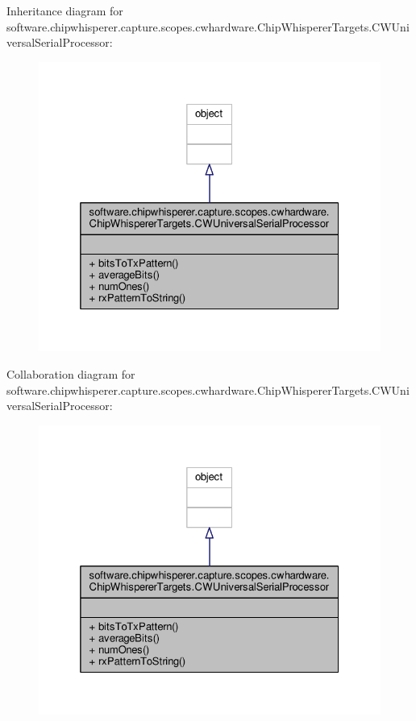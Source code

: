 Inheritance diagram for software.\+chipwhisperer.\+capture.\+scopes.\+cwhardware.\+Chip\+Whisperer\+Targets.\+C\+W\+Universal\+Serial\+Processor\+:\nopagebreak
\begin{figure}[H]
\begin{center}
\leavevmode
\includegraphics[width=325pt]{dc/dbb/classsoftware_1_1chipwhisperer_1_1capture_1_1scopes_1_1cwhardware_1_1ChipWhispererTargets_1_1CWUb0970174ce8d4aaef0c8655bbfec6bee}
\end{center}
\end{figure}


Collaboration diagram for software.\+chipwhisperer.\+capture.\+scopes.\+cwhardware.\+Chip\+Whisperer\+Targets.\+C\+W\+Universal\+Serial\+Processor\+:\nopagebreak
\begin{figure}[H]
\begin{center}
\leavevmode
\includegraphics[width=325pt]{d1/db5/classsoftware_1_1chipwhisperer_1_1capture_1_1scopes_1_1cwhardware_1_1ChipWhispererTargets_1_1CWU1f7b2a1430b8bf25f1823a26fa444d4c}
\end{center}
\end{figure}


